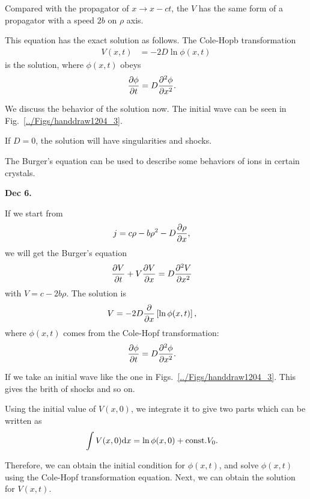 Compared with the propagator of $ x\rightarrow x-ct $, the $ V $ has the same form of a propagator with a speed $ 2b $ on $ \rho $ axis. 

This equation has the exact solution as follows. The Cole-Hopb transformation
\begin{align}
V(x,t) &= -2D \ln \phi(x,t)
\end{align}
is the solution, where $ \phi(x,t) $ obeys
\begin{align}
\frac{\partial {\phi}}{\partial t} &= D \frac{\partial^2 {\phi}}{\partial x^2}.
\end{align}

We discuss the behavior of the solution now. The initial wave can be seen in Fig.~\ref{../Figs/handdraw1204_3}.

If $ D=0 $, the solution will have singularities and shocks. 

The Burger's equation can be used to describe some behaviors of ions in certain crystals. 

\textbf{Dec 6.}

If we start from 
\begin{align}
j &= c\rho -b\rho^2 -D \frac{\partial {\rho}}{\partial x},
\end{align}
we will get the Burger's equation
\begin{align}
\frac{\partial {V}}{\partial t} + V \frac{\partial {V}}{\partial x} &= D \frac{\partial^2 {V}}{\partial x^2}
\end{align}
with $ V = c- 2b\rho $. The solution is 
\begin{align}
V &= -2D \frac{\partial {}}{\partial x}\left[ \ln \phi(x,t) \right],
\end{align}
where $ \phi(x,t) $ comes from the Cole-Hopf transformation:
\begin{align}
\frac{\partial {\phi}}{\partial t} &= D \frac{\partial^2 {\phi}}{\partial x^2}.
\end{align}

If we take an initial wave like the one in Figs.~\ref{../Figs/handdraw1204_3}. This gives the brith of shocks and so on. 

Using the initial value of $ V(x,0) $, we integrate it to give two parts which can be written as 
\begin{align}
\int V(x,0)\mathrm{d} x &= \ln \phi(x,0) + \mathrm{const.} V_0. 
\end{align}

Therefore, we can obtain the initial condition for $ \phi(x,t) $, and solve $ \phi(x,t) $ using the Cole-Hopf transformation equation. Next, we can obtain the solution for $ V(x,t) $. 

